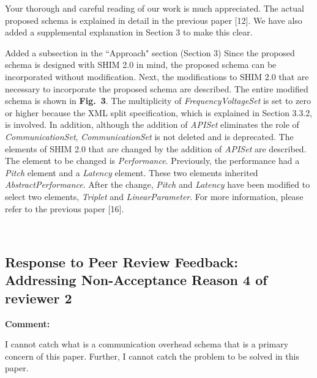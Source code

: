 \documentclass{article}
\begin{document}
\begin{adjustwidth}{1cm}{1cm}  %
    Your thorough and careful reading of our work is much appreciated. The actual proposed schema is explained in detail in the previous paper [12]. We have also added a supplemental explanation in Section 3 to make this clear.
\end{adjustwidth}
\bigskip
\begin{itembox}[|]{Added a subsection in the ``Approach" section (Section 3)}
    Since the proposed schema is designed with SHIM 2.0 in mind, the proposed schema can be incorporated without modification.
    Next, the modifications to SHIM 2.0 that are necessary to incorporate the proposed schema are described.
    The entire modified schema is shown in \textbf{Fig.~3}.
    The multiplicity of \textit{FrequencyVoltageSet} is set to zero or higher because the XML split specification, which is explained in Section 3.3.2, is involved.
    In addition, although the addition of \textit{APISet} eliminates the role of \textit{CommunicationSet}, \textit{CommunicationSet} is not deleted and is deprecated.
    The elements of SHIM 2.0 that are changed by the addition of \textit{APISet} are described.
    The element to be changed is \textit{Performance}.
    Previously, the performance had a \textit{Pitch} element and a \textit{Latency} element. These two elements inherited \textit{AbstractPerformance}.
    After the change, \textit{Pitch} and \textit{Latency} have been modified to select two elements, \textit{Triplet} and \textit{LinearParameter}.
    For more information, please refer to the previous paper [16].
\end{itembox}\\

\newpage
\subsection{Response to Peer Review Feedback: Addressing Non-Acceptance Reason 4 of reviewer 2}
\begin{flushleft}
  \textbf{Comment:}
\end{flushleft}
\begin{adjustwidth}{1cm}{1cm}  %
    I cannot catch what is a communication overhead schema that is a primary concern of this paper.  Further, I cannot catch the problem to be solved in this paper.  
\end{adjustwidth}
    
\end{document}
